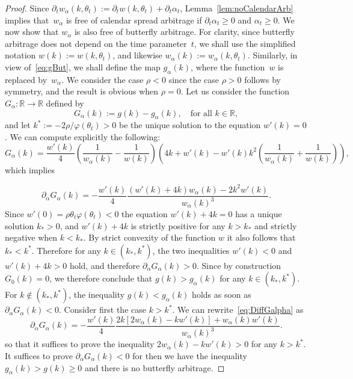 \documentclass[12pt]{article}
\numberwithin{equation}{section}
\newcommand{\p}{\partial}
\begin{document}
\begin{proof}
Since $\partial_t w_\alpha(k,\theta_t):=\partial_t w(k,\theta_t )+\partial_t \alpha_t$, 
Lemma~\ref{lem:noCalendarArb} implies that~$w_\alpha$ is free of calendar spread arbitrage if $\p_t\alpha_t \geq 0$ and $\alpha_t\geq 0$.
We now show that $w_\alpha$ is also free of butterfly arbitrage.
For clarity, since butterfly arbitrage does not depend on the time parameter~$t$, we shall use the simplified notation
$w(k):=w(k,\theta_t)$, and likewise $w_\alpha(k):=w_\alpha(k, \theta_t)$.
Similarly, in view of~\eqref{eq:gBut}, we shall define the map $g_\alpha(k)$, 
where the function~$w$ is replaced by~$w_\alpha$.
We consider the case $\rho<0$ since the case $\rho>0$ follows by symmetry, and the result is obvious when $\rho=0$.
Let us consider the function $G_\alpha:\mathbb{R}\to \mathbb{R}$ defined by
$$G_\alpha(k):=g(k)-g_\alpha(k), \quad\text{for all }k\in\mathbb{R},$$
and let $k^*:=-2\rho/\varphi(\theta_t)>0$ be the unique solution to the equation $w'(k)=0$.
We can compute explicitly the following:
$$
G_\alpha(k)=
\frac{w'(k)}{4}\left(\frac{1}{w_\alpha(k)}-\frac{1}{w(k)}\right)
\left(4k+w'(k)-w'(k)k^2\left(\frac{1}{w_\alpha(k)}+\frac{1}{w(k)}\right)\right),
$$
which implies


\begin{equation}\label{eq:DiffGalpha}
\partial_\alpha G_\alpha(k)= -\frac{w'(k)}{4}\frac{\left(w'(k)+4k\right)w_\alpha(k)-2k^2w'(k)}{w_\alpha(k)^3}.
\end{equation}
Since $w'(0)=\rho\theta_t\varphi(\theta_t)<0$ the equation $w'(k)+4k=0$ has a unique solution $k_*>0$,
and $w'(k)+4k$ is strictly positive for any $k>k_*$ and strictly negative when $k<k_*$.
By strict convexity of the function $w$ it also follows that $k_*<k^*$.
Therefore for any $k\in\left(k_*,k^*\right)$, the two inequalities
$w'(k)<0$ and $w'(k)+4k>0$
hold, and therefore $\partial_\alpha G_\alpha (k)>0$.
Since by construction $G_0(k)=0$, we therefore conclude that $g(k)>g_\alpha(k)$ for any $k\in\left(k_*,k^*\right)$.
For $k\notin\left(k_*,k^*\right)$, the inequality $g(k)<g_\alpha(k)$ holds as soon as $\partial_\alpha G_\alpha (k)<0$.
Consider first the case $k>k^*$.
We can rewrite~\eqref{eq:DiffGalpha} as
$$
\partial_\alpha G_\alpha(k)= -\frac{w'(k)}{4}\frac{2k\left[2w_\alpha(k)-kw'(k)\right]+w_\alpha(k)w'(k)}{w_\alpha(k)^3}.
$$
so that it suffices to prove the inequality $2w_\alpha(k)-kw'(k)>0$ for any $k>k^*$.
It suffices to prove $\partial_\alpha G_\alpha (k)<0$ for then we have the inequality $g_\alpha(k)>g(k) \geq 0$ and there is no butterfly arbitrage.


\end{proof}
\end{document}
